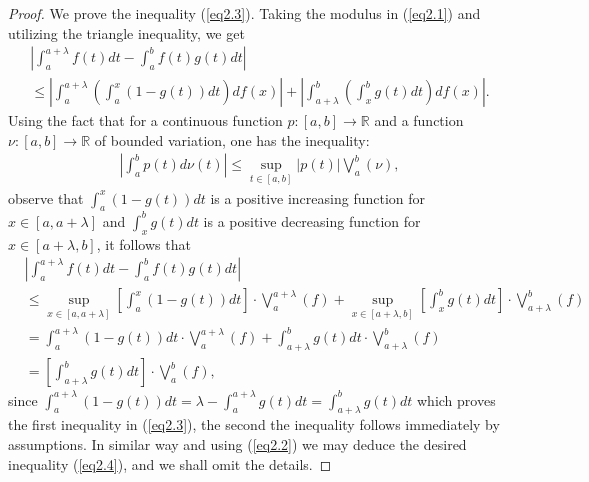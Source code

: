 \documentclass{amsart}
\theoremstyle{plain}
\numberwithin{equation}{section}
\begin{document}
\begin{proof}
We prove the inequality (\ref{eq2.3}). Taking the modulus in
(\ref{eq2.1}) and utilizing the triangle inequality, we get
\begin{multline*}
\left| {\int_a^{a + \lambda } {f\left( t \right)dt}  - \int_a^b
{f\left( t \right)g\left( t \right)dt} } \right|
\\
\le \left| {\int_a^{a + \lambda } {\left( {\int_a^x {\left( {1 -
g\left( t \right)} \right)dt} } \right)df\left( x \right)} }
\right| +\left| {\int_{a + \lambda }^b {\left( {\int_x^b {g\left(
t \right)dt} } \right)df\left( x \right)} } \right|.
\end{multline*}
Using the fact that for a continuous function $p:[a,b] \to
\mathbb{R}$ and a function $\nu:[a,b] \to \mathbb{R}$ of bounded
variation, one has the inequality:
\begin{align}
\label{eq2.5}\left| {\int_a^b {p\left( t \right)d\nu\left( t
\right)} } \right| \le \mathop {\sup }\limits_{t \in \left[ {a,b}
\right]} \left| {p\left( t \right)} \right| \bigvee_a^b\left( \nu
\right),
\end{align}
observe that $\int_a^x {\left( {1 - g\left( t \right)} \right)dt}$
is a positive increasing function for
$x\in{\left[a,a+\lambda\right]}$ and $\int_x^b {g\left( t
\right)dt}$ is a positive decreasing function for
$x\in{\left[a+\lambda,b\right]}$, it follows that
\begin{align*}
&\left| {\int_a^{a + \lambda } {f\left( t \right)dt}  - \int_a^b
{f\left( t \right)g\left( t \right)dt} } \right|
\\
&\le \mathop {\sup }\limits_{x \in \left[ {a,a + \lambda }
\right]} \left[ {\int_a^x {\left( {1 - g\left( t \right)}
\right)dt} } \right] \cdot \bigvee_a^{a + \lambda } \left( f
\right) + \mathop {\sup }\limits_{x \in \left[ {a + \lambda ,b}
\right]} \left[ {\int_x^b {g\left( t \right)dt} } \right] \cdot
\bigvee_{a + \lambda }^b \left( f \right)
\\
&=\int_a^{a + \lambda } {\left( {1 - g\left( t \right)} \right)dt}
\cdot \bigvee_a^{a + \lambda } \left( f \right) + \int_{a +
\lambda }^b {g\left( t \right)dt} \cdot \bigvee_{a + \lambda }^b
\left( f \right)
\\
&= \left[ {\int_{a + \lambda }^b {g\left( t \right)dt} } \right]
\cdot \bigvee_a^b \left( f \right),
\end{align*}
since $\int_a^{a + \lambda } {\left( {1 - g\left( t \right)}
\right)dt}=\lambda-\int_a^{a + \lambda } {g\left( t \right)dt}=
{\int_{a + \lambda }^b {g\left( t \right)dt} }$ which proves the
first inequality in (\ref{eq2.3}), the second the inequality
follows immediately by assumptions. In similar way and using
(\ref{eq2.2}) we may deduce the desired inequality (\ref{eq2.4}),
and we shall omit the details.
\end{proof}
\end{document}
